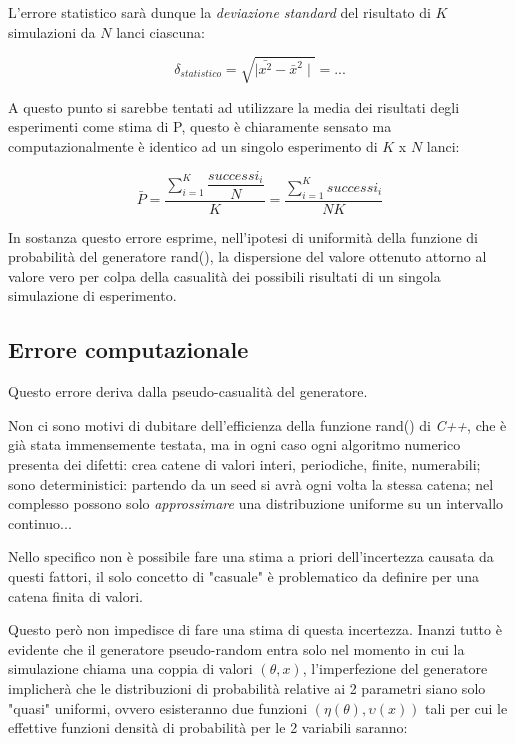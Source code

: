 \documentclass{article}
\begin{document}
L'errore statistico sarà dunque la \emph{deviazione standard} del risultato di $K$ simulazioni da $N$ lanci ciascuna:

	\begin{equation}
	\delta_{statistico}=\sqrt{\mid \bar{x^{2}}-\bar{x}^{2}\mid}= ...
	\end{equation}

A questo punto si sarebbe tentati ad utilizzare la media dei risultati degli esperimenti come stima di P, questo è chiaramente sensato ma computazionalmente è identico ad un singolo esperimento di $K$ x $N$ lanci:

	\begin{equation}
	\bar{P}=\dfrac{\sum_{i=1}^{K}\dfrac{successi_{i}}{N}}	{K}=\dfrac{\sum_{i=1}^{K}successi_{i}}{NK}
	\end{equation}

In sostanza questo errore esprime, nell'ipotesi di uniformità della funzione di probabilità del generatore rand(), la dispersione del valore ottenuto attorno al valore vero per colpa della casualità dei possibili risultati di un singola simulazione di esperimento.

\subsection{Errore computazionale}

Questo errore deriva dalla pseudo-casualità del generatore.

Non ci sono motivi di dubitare dell'efficienza della funzione rand() di \emph{C++}, che è già stata immensemente testata, ma in ogni caso ogni algoritmo numerico presenta dei difetti: crea catene di valori interi, periodiche, finite, numerabili; sono deterministici: partendo da un seed si avrà ogni volta la stessa catena; nel complesso possono solo \emph{approssimare} una distribuzione uniforme su un intervallo continuo...

Nello specifico non è possibile fare una stima a priori dell'incertezza causata da questi fattori, il solo concetto di "casuale" è problematico da definire per una catena finita di valori.

Questo però non impedisce di fare una stima di questa incertezza.
Inanzi tutto è evidente che il generatore pseudo-random entra solo nel momento in cui la simulazione chiama una coppia di valori $ \left( \theta ,x \right) $, l'imperfezione del generatore implicherà che le distribuzioni di probabilità relative ai 2 parametri siano solo "quasi" uniformi, ovvero esisteranno  due funzioni $(\eta(\theta),\upsilon(x))$ tali per cui le effettive funzioni densità di probabilità per le 2 variabili saranno:
\end{document}
